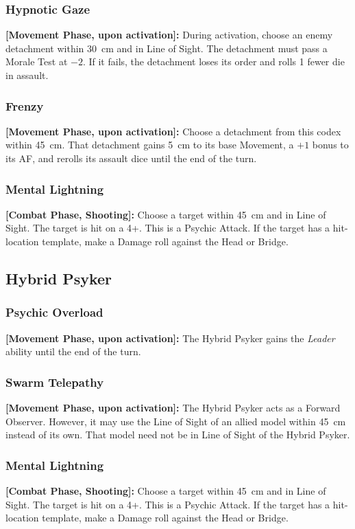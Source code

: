 \subsubsection{Hypnotic Gaze}

\textbf{[Movement Phase, upon activation]:} During activation, choose an enemy detachment within 30~cm and in Line of Sight. The detachment must pass a Morale Test at $-2$. If it fails, the detachment loses its order and rolls 1 fewer die in assault.

\subsubsection{Frenzy}

\textbf{[Movement Phase, upon activation]:} Choose a detachment from this codex within 45~cm. That detachment gains 5~cm to its base Movement, a $+1$ bonus to its AF, and rerolls its assault dice until the end of the turn.

\subsubsection{Mental Lightning}

\textbf{[Combat Phase, Shooting]:} Choose a target within 45~cm and in Line of Sight. The target is hit on a 4+. This is a Psychic Attack. If the target has a hit-location template, make a Damage roll against the Head or Bridge.

\subsection{Hybrid Psyker}

\subsubsection{Psychic Overload}

\textbf{[Movement Phase, upon activation]:} The Hybrid Psyker gains the \textit{Leader} ability until the end of the turn.

\subsubsection{Swarm Telepathy}

\textbf{[Movement Phase, upon activation]:} The Hybrid Psyker acts as a Forward Observer. However, it may use the Line of Sight of an allied model within 45~cm instead of its own. That model need not be in Line of Sight of the Hybrid Psyker.

\subsubsection{Mental Lightning}

\textbf{[Combat Phase, Shooting]:} Choose a target within 45~cm and in Line of Sight. The target is hit on a 4+. This is a Psychic Attack. If the target has a hit-location template, make a Damage roll against the Head or Bridge.
